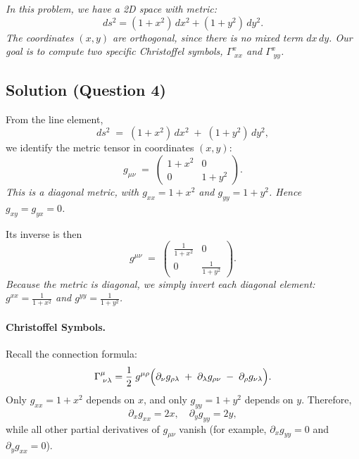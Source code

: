     \emph{In this problem, we have a 2D space with metric:
        \[
            ds^2 = (1 + x^2)\,dx^2 + (1 + y^2)\,dy^2.
        \]
        The coordinates \((x, y)\) are orthogonal, since there is no mixed term \(dx\,dy\). Our goal is to compute two specific Christoffel symbols, \(\Gamma^x_{\;xx}\) and \(\Gamma^x_{\;yy}\).}

    \subsection*{Solution (Question 4)}

    \noindent
    From the line element,
    \[
        ds^2 \;=\; (1 + x^2)\,dx^2 \;+\; (1 + y^2)\,dy^2,
    \]
    we identify the metric tensor in coordinates \((x,y)\):
    \[
        g_{\mu\nu} \;=\;
        \begin{pmatrix}
            1 + x^2 & 0       \\
            0       & 1 + y^2
        \end{pmatrix}.
    \]
    \emph{This is a diagonal metric, with \(g_{xx} = 1 + x^2\) and \(g_{yy} = 1 + y^2\). Hence \(g_{xy} = g_{yx} = 0\).}

    Its inverse is then
    \[
        g^{\mu\nu} \;=\;
        \begin{pmatrix}
            \frac{1}{1 + x^2} & 0                 \\
            0                 & \frac{1}{1 + y^2}
        \end{pmatrix}.
    \]
    \emph{Because the metric is diagonal, we simply invert each diagonal element: \(g^{xx} = \tfrac{1}{1+x^2}\) and \(g^{yy} = \tfrac{1}{1+y^2}\).}

    \medskip

    \paragraph{Christoffel Symbols.}
    Recall the connection formula:
    \[
        \Gamma^{\mu}_{\;\nu\lambda}
        =
        \frac{1}{2}\;g^{\mu\rho}
        \Bigl(
        \partial_\nu g_{\rho\lambda}
        \;+\;
        \partial_\lambda g_{\rho\nu}
        \;-\;
        \partial_\rho g_{\nu\lambda}
        \Bigr).
    \]
    Only \(g_{xx} = 1 + x^2\) depends on \(x\), and only \(g_{yy} = 1 + y^2\) depends on \(y\). Therefore,
    \[
        \partial_x g_{xx} = 2x,
        \quad
        \partial_y g_{yy} = 2y,
    \]
    while all other partial derivatives of \(g_{\mu\nu}\) vanish (for example, \(\partial_x g_{yy} = 0\) and \(\partial_y g_{xx} = 0\)).

